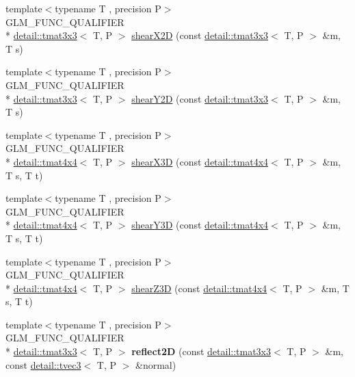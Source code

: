 \begin{DoxyCompactItemize}
\item 
{\footnotesize template$<$typename T , precision P$>$ }\\G\-L\-M\-\_\-\-F\-U\-N\-C\-\_\-\-Q\-U\-A\-L\-I\-F\-I\-E\-R \\*
\hyperlink{structglm_1_1detail_1_1tmat3x3}{detail\-::tmat3x3}$<$ T, P $>$ \hyperlink{group__gtx__transform2_gaa5a2d9216b3298b03252e549de6fd98a}{shear\-X2\-D} (const \hyperlink{structglm_1_1detail_1_1tmat3x3}{detail\-::tmat3x3}$<$ T, P $>$ \&m, T s)
\item 
{\footnotesize template$<$typename T , precision P$>$ }\\G\-L\-M\-\_\-\-F\-U\-N\-C\-\_\-\-Q\-U\-A\-L\-I\-F\-I\-E\-R \\*
\hyperlink{structglm_1_1detail_1_1tmat3x3}{detail\-::tmat3x3}$<$ T, P $>$ \hyperlink{group__gtx__transform2_ga1f5e68ada7a56cdf86c0c56d0b0a1832}{shear\-Y2\-D} (const \hyperlink{structglm_1_1detail_1_1tmat3x3}{detail\-::tmat3x3}$<$ T, P $>$ \&m, T s)
\item 
{\footnotesize template$<$typename T , precision P$>$ }\\G\-L\-M\-\_\-\-F\-U\-N\-C\-\_\-\-Q\-U\-A\-L\-I\-F\-I\-E\-R \\*
\hyperlink{structglm_1_1detail_1_1tmat4x4}{detail\-::tmat4x4}$<$ T, P $>$ \hyperlink{group__gtx__transform2_gaae5bbb490a3d798b083cbec0e0c2e94c}{shear\-X3\-D} (const \hyperlink{structglm_1_1detail_1_1tmat4x4}{detail\-::tmat4x4}$<$ T, P $>$ \&m, T s, T t)
\item 
{\footnotesize template$<$typename T , precision P$>$ }\\G\-L\-M\-\_\-\-F\-U\-N\-C\-\_\-\-Q\-U\-A\-L\-I\-F\-I\-E\-R \\*
\hyperlink{structglm_1_1detail_1_1tmat4x4}{detail\-::tmat4x4}$<$ T, P $>$ \hyperlink{group__gtx__transform2_ga4b5af90ecf76d312bb371f6111e1ae35}{shear\-Y3\-D} (const \hyperlink{structglm_1_1detail_1_1tmat4x4}{detail\-::tmat4x4}$<$ T, P $>$ \&m, T s, T t)
\item 
{\footnotesize template$<$typename T , precision P$>$ }\\G\-L\-M\-\_\-\-F\-U\-N\-C\-\_\-\-Q\-U\-A\-L\-I\-F\-I\-E\-R \\*
\hyperlink{structglm_1_1detail_1_1tmat4x4}{detail\-::tmat4x4}$<$ T, P $>$ \hyperlink{group__gtx__transform2_ga02fa747667daf42b64ea344d1076acee}{shear\-Z3\-D} (const \hyperlink{structglm_1_1detail_1_1tmat4x4}{detail\-::tmat4x4}$<$ T, P $>$ \&m, T s, T t)
\item 
\hypertarget{namespaceglm_a8da591eb7bc7747abb311d91162e0e13}{{\footnotesize template$<$typename T , precision P$>$ }\\G\-L\-M\-\_\-\-F\-U\-N\-C\-\_\-\-Q\-U\-A\-L\-I\-F\-I\-E\-R \\*
\hyperlink{structglm_1_1detail_1_1tmat3x3}{detail\-::tmat3x3}$<$ T, P $>$ {\bfseries reflect2\-D} (const \hyperlink{structglm_1_1detail_1_1tmat3x3}{detail\-::tmat3x3}$<$ T, P $>$ \&m, const \hyperlink{structglm_1_1detail_1_1tvec3}{detail\-::tvec3}$<$ T, P $>$ \&normal)}\label{namespaceglm_a8da591eb7bc7747abb311d91162e0e13}


\end{DoxyCompactItemize}
